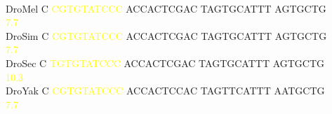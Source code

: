 \documentclass[11pt,twoside,reqno,a4paper]{article}
\begin{document}
{\\
DroMel	C	\textcolor{Yellow}{C}\textcolor{Yellow}{G}\textcolor{Yellow}{T}\textcolor{Yellow}{G}\textcolor{Yellow}{T}\textcolor{Yellow}{A}\textcolor{Yellow}{T}\textcolor{Yellow}{C}\textcolor{Yellow}{C}\textcolor{Yellow}{C}	ACCACTCGAC	TAGTGCATTT	AGTGCTG\\
\hspace*{7\charwidth}\hspace*{1\charwidth}\hspace*{1\charwidth}\textcolor{Yellow}{7.7}\hspace*{1\charwidth}\hspace*{1\charwidth}\hspace*{1\charwidth}\\
DroSim	C	\textcolor{Yellow}{C}\textcolor{Yellow}{G}\textcolor{Yellow}{T}\textcolor{Yellow}{G}\textcolor{Yellow}{T}\textcolor{Yellow}{A}\textcolor{Yellow}{T}\textcolor{Yellow}{C}\textcolor{Yellow}{C}\textcolor{Yellow}{C}	ACCACTCGAC	TAGTGCATTT	AGTGCTG\\
\hspace*{7\charwidth}\hspace*{1\charwidth}\hspace*{1\charwidth}\textcolor{Yellow}{7.7}\hspace*{1\charwidth}\hspace*{1\charwidth}\hspace*{1\charwidth}\\
DroSec	C	\textcolor{Yellow}{T}\textcolor{Yellow}{G}\textcolor{Yellow}{T}\textcolor{Yellow}{G}\textcolor{Yellow}{T}\textcolor{Yellow}{A}\textcolor{Yellow}{T}\textcolor{Yellow}{C}\textcolor{Yellow}{C}\textcolor{Yellow}{C}	ACCACTCGAC	TAGTGCATTT	AGTGCTG\\
\hspace*{7\charwidth}\hspace*{1\charwidth}\hspace*{1\charwidth}\textcolor{Yellow}{10.3}\hspace*{1\charwidth}\hspace*{1\charwidth}\hspace*{1\charwidth}\\
DroYak	C	\textcolor{Yellow}{C}\textcolor{Yellow}{G}\textcolor{Yellow}{T}\textcolor{Yellow}{G}\textcolor{Yellow}{T}\textcolor{Yellow}{A}\textcolor{Yellow}{T}\textcolor{Yellow}{C}\textcolor{Yellow}{C}\textcolor{Yellow}{C}	ACCACTCCAC	TAGTTCATTT	AATGCTG\\
\hspace*{7\charwidth}\hspace*{1\charwidth}\hspace*{1\charwidth}\textcolor{Yellow}{7.7}\hspace*{1\charwidth}\hspace*{1\charwidth}\hspace*{1\charwidth}\\
}
\end{document}
